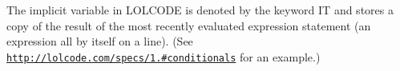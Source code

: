 The implicit variable in L\+O\+L\+C\+O\+DE is denoted by the keyword {\ttfamily IT} and stores a copy of the result of the most recently evaluated expression statement (an expression all by itself on a line). (See \href{http://lolcode.com/specs/1.2#conditionals}{\tt http\+://lolcode.\+com/specs/1.\#conditionals} for an example.) 